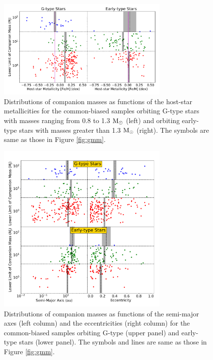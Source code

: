 \documentclass[twocolumn]{aastex62}
\begin{document}
\begin{CJK*}{UTF8}{min}
\begin{figure}[t]
\begin{center}
\includegraphics[width=8.5cm]{metal_Mp_sep.pdf}
\caption{Distributions of companion masses as functions of the host-star metallicities for the common-biased samples orbiting G-type stars with masses ranging from 0.8 to 1.3 $\rm M_{\odot}$ (left) and orbiting early-type stars with masses greater than 1.3 $\rm M_{\odot}$ (right). The symbols are same as those in Figure \ref{fig:gmm}.}
\label{fig:metal_Mp_sep}
\end{center}
\end{figure}

\begin{figure}[t]
\begin{center}
\includegraphics[width=8.5cm]{orbit_Mp_sep.pdf}
\caption{Distributions of companion masses as functions of the semi-major axes (left column) and the eccentricities (right column) for the common-biased samples orbiting G-type (upper panel) and early-type stars (lower panel). The symbols and lines are same as those in Figure \ref{fig:gmm}.}
\label{fig:orbit_Mp_sep}
\end{center}
\end{figure}



\end{CJK*}
\end{document}

